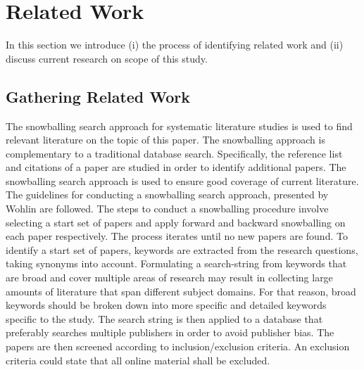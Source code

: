 \iffalse  \fi

\chapter{Related Work} \label{section:relatedwork} 
In this section we introduce (i) the process of identifying related work and (ii) discuss current research on scope of this study. %




\section{Gathering Related Work}
The snowballing search approach for systematic literature studies is used to find relevant literature on the topic of this paper. The snowballing approach is complementary to a traditional database search. Specifically, the reference list and citations of a paper are studied in order to identify additional papers. The snowballing search approach is used to ensure good coverage of current literature.\\

The guidelines for conducting a snowballing search approach, presented by Wohlin \cite{Wohlin} are followed. The steps to conduct a snowballing procedure involve selecting a start set of papers and apply forward and backward snowballing on each paper respectively. The process iterates until no new papers are found. To identify a start set of papers, keywords are extracted from the research questions, taking synonyms into account. Formulating a search-string from keywords that are broad and cover multiple areas of research may result in collecting large amounts of literature that span different subject domains. For that reason, broad keywords should be broken down into more specific and detailed keywords specific to the study. The search string is then applied to a database that preferably searches multiple publishers in order to avoid publisher bias. The papers are then screened according to inclusion/exclusion criteria. An exclusion criteria could state that all online material shall be excluded. \\

